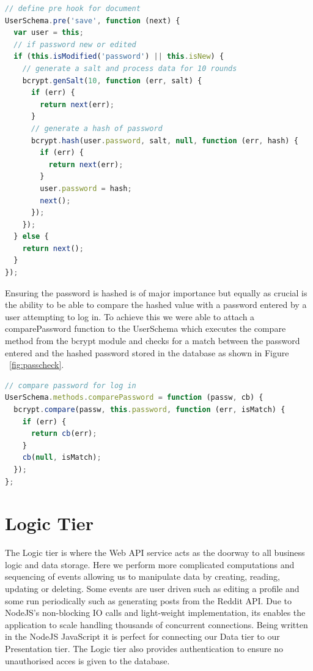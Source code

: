 \begin{lstlisting}[language=JavaScript,caption={Password Hashing},captionpos=b,label={fig:presave}]
// define pre hook for document
UserSchema.pre('save', function (next) {
  var user = this;
  // if password new or edited
  if (this.isModified('password') || this.isNew) {
    // generate a salt and process data for 10 rounds
    bcrypt.genSalt(10, function (err, salt) {
      if (err) {
        return next(err);
      }
      // generate a hash of password
      bcrypt.hash(user.password, salt, null, function (err, hash) {
        if (err) {
          return next(err);
        }
        user.password = hash;
        next();
      });
    });
  } else {
    return next();
  }
});

\end{lstlisting}
Ensuring the password is hashed is of major importance but equally as crucial is the ability to be able to compare the hashed value with a password entered by a user attempting to log in. To achieve this we were able to attach a comparePassword function to the UserSchema which executes the compare method from the bcrypt module and checks for a match between the password entered and the hashed password stored in the database as shown in Figure ~\ref{fig:passcheck}. 
\begin{lstlisting}[language=JavaScript,caption={Password Comparision},captionpos=b,label={fig:passcheck}]
// compare password for log in
UserSchema.methods.comparePassword = function (passw, cb) {
  bcrypt.compare(passw, this.password, function (err, isMatch) {
    if (err) {
      return cb(err);
    }
    cb(null, isMatch);
  });
};
\end{lstlisting}

\section{Logic Tier}

The Logic tier is where the Web API service acts as the doorway to all business logic and data storage.
Here we perform more complicated computations and sequencing of events allowing us to manipulate data by creating, reading, updating or deleting. Some events are user driven such as editing a profile and some run periodically such as generating posts from the Reddit API. Due to NodeJS's non-blocking IO calls and light-weight implementation, its enables the application to scale handling thousands of concurrent connections. Being written in the NodeJS JavaScript it is perfect for connecting our Data tier to our Presentation tier. The Logic tier also provides authentication to ensure no unauthorised acces is given to the database.

